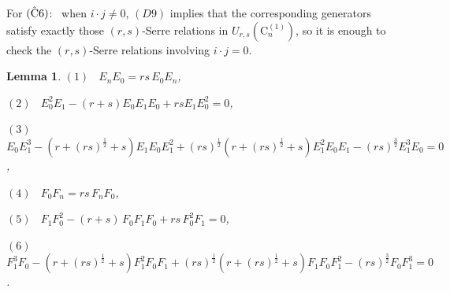 \documentclass{amsproc}
\newtheorem{lemm}[theo]{Lemma}
\theoremstyle{remark}
\numberwithin{equation}{section}
\begin{document}
For $(\hat{\rm C}6)$: \ when $i\cdot j \neq 0$, $(D9)$ implies that
the corresponding generators satisfy exactly those $(r,s)$-Serre
relations in $U_{r,s}(\mathrm{C}_n^{(1)})$, so it is enough to check
the $(r,s)$-Serre relations involving $i\cdot j=0$.

\begin{lemm} {\it $(1)$ \ $E_nE_0=rs\,E_0E_n$,

$(2)$ \ $E_0^2E_1-(r+s)E_0E_1E_0+rsE_1E_0^2=0$,

$(3)$ \ $E_0E_1^3-(r+(rs)^{\frac{1}{2}}+s)E_1E_0E_1^2+
(rs)^{\frac{1}{2}}(r+(rs)^{\frac{1}{2}}+s)E_1^2E_0E_1
-(rs)^{\frac{3}{2}}E_1^3E_0=0$,

$(4)$ \ $F_0F_n=rs\,F_nF_0$,

$(5)$ \ $F_{1}F_0^{2}-(r+s)\,F_{0}F_1F_{0}+rs\,F_0^2F_{1}=0$,

$(6)$ \ $F_1^3F_{0}-(r+(rs)^{\frac{1}{2}}+s)
F_1^2F_{0}F_1+(rs)^{\frac{1}{2}}(r+(rs)^{\frac{1}{2}}+s)F_1F_0F_{1}^2
-(rs)^{\frac{3}{2}}F_0F_1^3=0$.}
\end{lemm}
\end{document}
